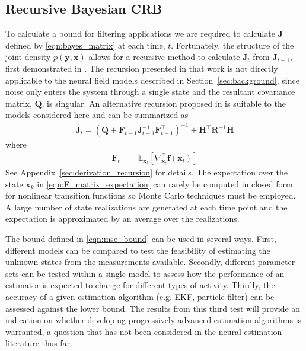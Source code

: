 \documentclass{article}
\renewcommand{\vec}[1]{\ensuremath{{\boldsymbol #1}}}
\begin{document}
\subsection{Recursive Bayesian CRB}
To calculate a bound for filtering applications we are required to calculate $\mathbf{J}$ defined by \eqref{eqn:bayes_matrix} at each time, $t$. Fortunately, the structure of the joint density $p(\mathbf{y},\mathbf{x})$ allows for a recursive method to calculate $\mathbf{J}_t$ from $\mathbf{J}_{t-1}$, first demonstrated in \cite{Tichavsky1998}. The recursion presented in that work is not directly applicable to the neural field models described in Section~\ref{sec:background}, since noise only enters the system through a single state and the resultant covariance matrix, $\mathbf{Q}$, is singular. An alternative recursion proposed in \cite{Bergman2001} is suitable to the models considered here and can be summarized as 
\begin{align}
	\mathbf{J}_t = \left( \mathbf{Q} + {\mathbf{F}}_{t-1} \mathbf{J}_{t-1}^{-1} {\mathbf{F}}_{t-1}^{\top}\right)^{-1} + \mathbf{H}^{\top} \mathbf{R}^{-1} \mathbf{H}
\end{align}
where
\begin{align}
		\mathbf{F}_t &= \mathbb E_{\mathbf{x}_t} \left[ \nabla_{\mathbf{x}_t}^{\top} \vec f(\mathbf{x}_t)\right] 
		\label{eqn:F_matrix_expectation}
\end{align}
See Appendix~\ref{sec:derivation_recursion} for details. The expectation over the state $\vec x_k$ in \eqref{eqn:F_matrix_expectation} can rarely be computed in closed form for nonlinear transition functions so Monte Carlo techniques must be employed. A large number of state realizations are generated at each time point and the expectation is approximated by an average over the realizations.

The bound defined in \eqref{eqn:mse_bound} can be used in several ways. First, different models can be compared to test the feasibility of estimating the unknown states from the measurements available. Secondly, different parameter sets can be tested within a single model to assess how the performance of an estimator is expected to change for different types of activity. Thirdly, the accuracy of a given estimation algorithm (e.g. EKF, particle filter) can be assessed against the lower bound. The results from this third test will provide an indication on whether developing progressively advanced estimation algorithms is warranted, a question that has not been considered in the neural estimation literature thus far.
\end{document}
